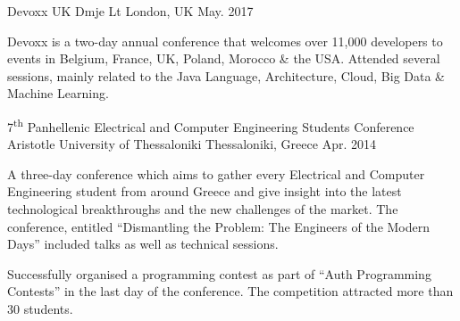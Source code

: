 

\begin{cventries}

  \cventry
    {Devoxx UK} %
    {Dmje Lt} %
    {London, UK} %
    {May. 2017} %
    {
      \begin{cvitems} %
        \item {Devoxx is a two-day annual conference that welcomes over 11,000 developers to events in Belgium, France, UK, Poland, Morocco \& the USA. Attended several sessions, mainly related to the Java Language, Architecture,  Cloud, Big Data \& Machine Learning.}
      \end{cvitems}
    }

  \cventry
    {7\textsuperscript{th} Panhellenic Electrical and Computer Engineering Students Conference} %
    {Aristotle University of Thessaloniki} %
    {Thessaloniki, Greece} %
    {Apr. 2014} %
    {
      \begin{cvitems} %
        \item {A three-day conference which aims to gather every Electrical and Computer Engineering student from around Greece and give insight into the latest technological breakthroughs and the new challenges of the market. The conference, entitled ``Dismantling the Problem: The Engineers of the Modern Days'' included talks as well as technical sessions.}
        \item {Successfully organised a programming contest as part of ``Auth Programming Contests'' in the last day of the conference. The competition attracted more than 30 students.}
      \end{cvitems}
    }

\end{cventries}
